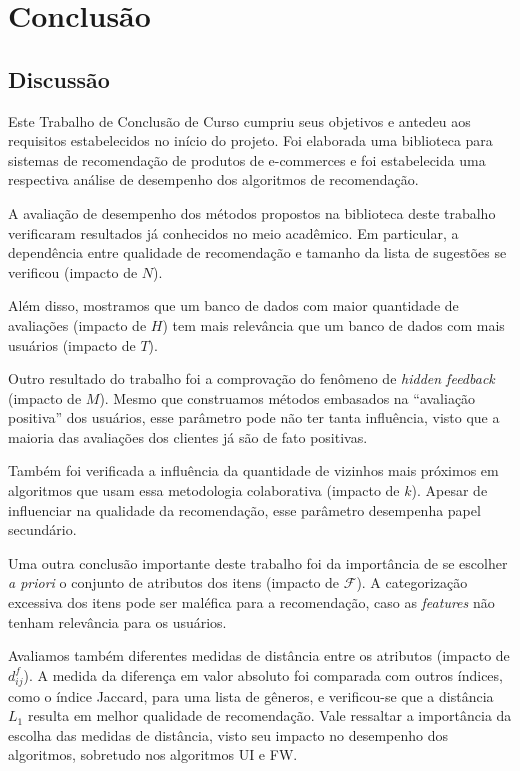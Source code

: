 \chapter{Conclusão}
\label{cha:trabalhos_futuros}

\section{Discussão} %
\label{sec:discuss_o}

Este Trabalho de Conclusão de Curso cumpriu seus objetivos e antedeu aos requisitos estabelecidos no início do projeto. Foi elaborada uma biblioteca para sistemas de recomendação de produtos de e-commerces e foi estabelecida uma respectiva análise de desempenho dos algoritmos de recomendação.

A avaliação de desempenho dos métodos propostos na biblioteca deste trabalho verificaram resultados já conhecidos no meio acadêmico. Em particular, a dependência entre qualidade de recomendação e tamanho da lista de sugestões se verificou (impacto de $N$). 

Além disso, mostramos que um banco de dados com maior quantidade de avaliações (impacto de $H$) tem mais relevância que um banco de dados com mais usuários (impacto de $T$). 

Outro resultado do trabalho foi a comprovação do fenômeno de \textit{hidden feedback} (impacto de $M$). Mesmo que construamos métodos embasados na ``avaliação positiva'' dos usuários, esse parâmetro pode não ter tanta influência, visto que a maioria das avaliações dos clientes já são de fato positivas.

Também foi verificada a influência da quantidade de vizinhos mais próximos em algoritmos que usam essa metodologia colaborativa (impacto de $k$). Apesar de influenciar na qualidade da recomendação, esse parâmetro desempenha papel secundário.

Uma outra conclusão importante deste trabalho foi da importância de se escolher \textit{a priori} o conjunto de atributos dos itens (impacto de $\mathcal{F}$). A categorização excessiva dos itens pode ser maléfica para a recomendação, caso as \textit{features} não tenham relevância para os usuários.

Avaliamos também diferentes medidas de distância entre os atributos (impacto de $d_{ij}^f$). A medida da diferença em valor absoluto foi comparada com outros índices, como o índice Jaccard, para uma lista de gêneros, e verificou-se que a distância $L_1$ resulta em melhor qualidade de recomendação. Vale ressaltar a importância da escolha das medidas de distância, visto seu impacto no desempenho dos algoritmos, sobretudo nos algoritmos UI e FW.

